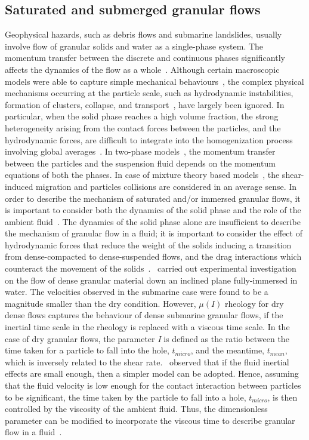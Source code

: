 \subsection{Saturated and submerged granular flows}
Geophysical hazards, such as debris flows and submarine landslides, usually 
involve flow of granular solids and water as a single-phase system. The 
momentum transfer between the discrete and continuous phases significantly 
affects the dynamics of the flow as a whole~\citep{Topin2011}. Although certain 
macroscopic models were able to capture simple mechanical 
behaviours~\citep{Peker2007}, the complex physical mechanisms occurring at the 
particle scale, such as hydrodynamic instabilities, formation of clusters, 
collapse, and transport~\citep{Topin2011}, have largely been ignored. In 
particular, when the solid phase reaches a high volume fraction, the strong 
heterogeneity arising from the contact forces between the particles, and the 
hydrodynamic forces, are difficult to integrate into the homogenization process 
involving global averages~\citep{Topin2011}. In two-phase 
models~\citep{Pitman2005}, the momentum transfer between the particles and the 
suspension fluid depends on the momentum equations of both the phases. In case 
of mixture theory based models~\citep{Meruane2010}, the shear-induced migration 
and particles collisions are considered in an average sense. In order to 
describe the mechanism of saturated and/or immersed granular flows, it is 
important to consider both the dynamics of the solid phase and the role of the 
ambient fluid~\citep{Denlinger2001,Iverson1997}. The dynamics of the solid 
phase alone are insufficient to describe the mechanism of granular flow in a 
fluid; it is important to consider the effect of hydrodynamic forces that 
reduce the weight of the solids inducing a transition from dense-compacted to 
dense-suspended flows, and the drag interactions which counteract the movement 
of the solids~\citep{Meruane2010}.~\citet{Cassar2005} carried out experimental 
investigation on the flow of dense granular material down an inclined plane 
fully-immersed in water. The velocities observed in the submarine case were 
found to be a magnitude smaller than the dry condition. However, 
$\mu(\textit{I})$ rheology for dry dense flows captures the behaviour of dense 
submarine granular flows, if the inertial time scale in the rheology is 
replaced with a viscous time scale. In the case of dry granular flows, the 
parameter \textit{I} is defined as the ratio between the time taken for a 
particle to fall into the hole, $\textit{t}_{\textit{micro}}$, and the 
meantime, $\textit{t}_{\textit{mean}}$, which is inversely related to the shear 
rate.~\citet{Pitman2005} observed that if the fluid inertial effects are small 
enough, then a simpler model can be adopted. Hence, assuming that the fluid 
velocity is low enough for the contact interaction between particles to be 
significant, the time taken by the particle to fall into a hole, 
$\textit{t}_{\textit{micro}}$, is  then controlled by the viscosity of the 
ambient fluid. Thus, the dimensionless parameter can be modified to incorporate 
the viscous time to describe granular flow in a fluid~\citep{Pouliquen2005}. 


